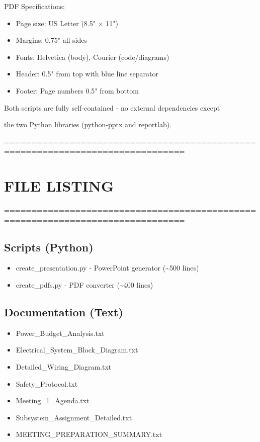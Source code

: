 \documentclass[11pt,letterpaper]{article}
\begin{document}
PDF Specifications:\par

\begin{itemize}
  \item Page size: US Letter (8.5" $\times$ 11")
  \item Margins: 0.75" all sides
  \item Fonts: Helvetica (body), Courier (code/diagrams)
  \item Header: 0.5" from top with blue line separator
  \item Footer: Page numbers 0.5" from bottom
\end{itemize}

Both scripts are fully self-contained - no external dependencies except\par

the two Python libraries (python-pptx and reportlab).\par

===============================================================================\par

\section{FILE LISTING}

===============================================================================\par

\subsection{Scripts (Python)}

\begin{itemize}
  \item create\_presentation.py    - PowerPoint generator (\textasciitilde{}500 lines)
  \item create\_pdfs.py           - PDF converter (\textasciitilde{}400 lines)
\end{itemize}

\subsection{Documentation (Text)}

\begin{itemize}
  \item Power\_Budget\_Analysis.txt
  \item Electrical\_System\_Block\_Diagram.txt
  \item Detailed\_Wiring\_Diagram.txt
  \item Safety\_Protocol.txt
  \item Meeting\_1\_Agenda.txt
  \item Subsystem\_Assignment\_Detailed.txt
  \item MEETING\_PREPARATION\_SUMMARY.txt
\end{itemize}
\end{document}

